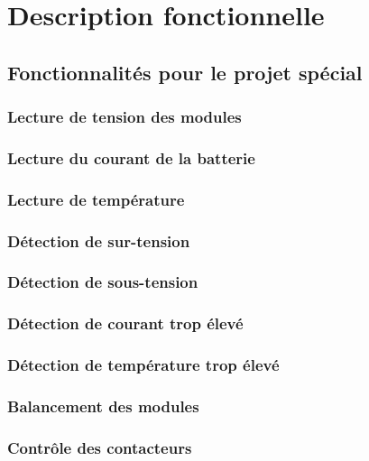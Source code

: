 
\section{Description fonctionnelle}

	\subsection{Fonctionnalités pour le projet spécial}
		\subsubsection{Lecture de tension des modules}
		
		\subsubsection{Lecture du courant de la batterie}
		
		\subsubsection{Lecture de température}
		
		\subsubsection{Détection de sur-tension}
		
		\subsubsection{Détection de sous-tension}
		
		\subsubsection{Détection de courant trop élevé}
		
		\subsubsection{Détection de température trop élevé}
		
		\subsubsection{Balancement des modules}
		
		\subsubsection{Contrôle des contacteurs}
		
